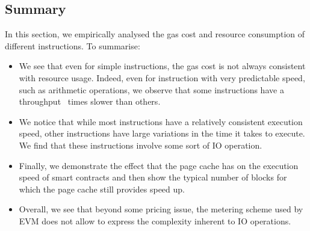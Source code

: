 \subsection{Summary}
In this section, we empirically analysed the gas cost and resource consumption of different instructions. To summarise:
\begin{itemize}
\item We see that even for simple instructions, the gas cost is not always consistent with resource usage. Indeed, even for instruction with very predictable speed, such as arithmetic operations, we observe that some instructions have a throughput~ times slower than others.
\item We notice that while most instructions have a relatively consistent execution speed, other instructions have large variations in the time it takes to execute. We find that these instructions involve some sort of IO operation.
\item Finally, we demonstrate the effect that the page cache has on the execution speed of smart contracts and then show the typical number of blocks for which the page cache still provides speed up.
\item Overall, we see that beyond some pricing issue, the metering scheme used by EVM does not allow to express the complexity inherent to IO operations.
\end{itemize}
